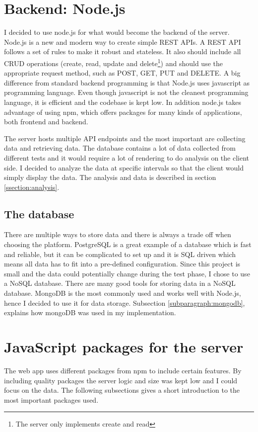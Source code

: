 \documentclass[USenglish]{ifimaster}  %
\begin{document}
\section{Backend: Node.js}
I decided to use node.js for what would become the backend of the server. Node.js is a new and modern way to create simple REST APIs. A REST API follows a set of rules to make it robust and stateless. It also should include all CRUD operations (create, read, update and delete\footnote{The server only implements create and read}) and should use the appropriate request method, such as POST, GET, PUT and DELETE. A big difference from standard backend programming is that Node.js uses javascript as programming language. Even though javascript is not the cleanest programming language, it is efficient and the codebase is kept low. In addition node.js takes advantage of using \acrfull{npm}, which offers packages for many kinds of applications, both frontend and backend.

The server hosts multiple API endpoints and the most important are collecting data and retrieving data. The database contains a lot of data collected from different tests and it would require a lot of rendering to do analysis on the client side. I decided to analyze the data at specific intervals so that the client would simply display the data. The analysis and data is described in section \vref{ssection:analysis}.

\subsection{The database}
There are multiple ways to store data and there is always a trade off when choosing the platform. PostgreSQL is a great example of a database which is fast and reliable, but it can be complicated to set up and it is SQL driven which means all data has to fit into a pre-defined configuration. Since this project is small and the data could potentially change during the test phase, I chose to use a NoSQL database. There are many good tools for storing data in a NoSQL database. MongoDB is the most commonly used and works well with Node.js, hence I decided to use it for data storage. Subsection \vref{subparagraph:mongodb}, explains how mongoDB was used in my implementation.

\section{JavaScript packages for the server}
The web app uses different packages from \acrshort{npm} to include certain features. By including quality packages the server logic and size was kept low and I could focus on the data. The following subsections gives a short introduction to the most important packages used.
\end{document}
